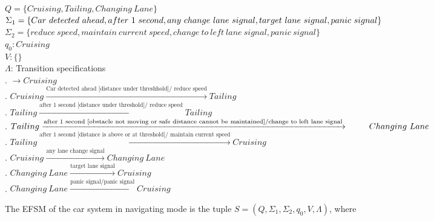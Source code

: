 \documentclass[12pt]{article}
\begin{document}
\begin{spacing}{1.5}
\noindent $Q = \{Cruising, Tailing, Changing~Lane\}$\\
\noindent $\Sigma_1 = \{Car~detected~ahead, after~1~second, any~change~lane~signal, target~lane~signal, \\ panic~signal\}$\\
\noindent $\Sigma_2 = \{reduce~speed, maintain~current~speed, change~to~left~lane~signal, panic~signal\}$\\
\noindent $q_0: Cruising$\\
\noindent $V: \{\}$\\
\noindent $\Lambda$: Transition specifications\\
. $\rightarrow Cruising$\\
. $Cruising \xrightarrow {\text {Car~detected~ahead [distance under threshhold]/ reduce~speed}} Tailing$\\
. $Tailing \xrightarrow {\text {after~1~second [distance under threshold]/ reduce~speed}} Tailing$\\
. $Tailing \xrightarrow {\text {after~1~second [obstacle not moving or safe distance cannot be maintained]/ \\change~to~left~lane~signal}}\\ \indent     ~~~Changing~Lane$\\
. $Tailing \xrightarrow {\text {after~1~second [distance is above or at threshold]/ maintain~current~speed}} Cruising$\\
. $Cruising \xrightarrow {\text {any~lane~change~signal}} Changing~Lane$\\
. $Changing~Lane \xrightarrow {\text {target~lane~signal}} Cruising$\\
. $Changing~Lane \xrightarrow {\text {panic~signal/panic~signal}} Cruising$\\

\newpage

\noindent The EFSM of the car system in navigating mode is the tuple $S = (Q, \Sigma_1, \Sigma_2, q_0, V, \Lambda)$, where\\


\end{spacing}
\end{document}
